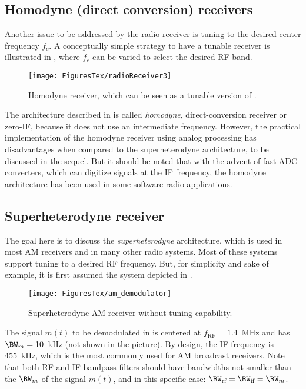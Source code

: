 \subsection{Homodyne (direct conversion) receivers}
Another issue to be addressed by the radio receiver is tuning to the desired center frequency $f_c$. 
A conceptually simple strategy to have a tunable receiver is illustrated in , where $f_c$ can be varied to select the desired RF band.

\begin{figure}[htbp]
	\centering
		\texttt{[image: FiguresTex/radioReceiver3]}		
	\caption{Homodyne receiver, which can be seen as a tunable version of .\label{fig:radioReceiver3}}
\end{figure}

The architecture described in  is called \emph{homodyne},
 direct-conversion receiver or zero-IF, because it does not use an intermediate frequency. 
However, the practical implementation of the homodyne receiver using analog processing has disadvantages when compared to the superheterodyne architecture, to be discussed in the sequel. But it should be noted that with the advent of fast ADC converters, which can digitize signals at the IF frequency, the homodyne architecture has been used in some software radio applications.

\subsection{Superheterodyne receiver}

The goal here is to discuss the \emph{superheterodyne} architecture, which is used in most AM receivers and in many other radio systems. Most of these systems support tuning to a desired RF frequency. But, for simplicity and sake of example, it is first assumed the system depicted in .

\begin{figure}[htbp]
\centering
\texttt{[image: FiguresTex/am\_demodulator]}
\caption{Superheterodyne AM receiver without tuning capability.\label{fig:am_demodulator}}
\end{figure}

The signal $m(t)$ to be demodulated in  is centered at $f_{\textrm{RF}}=1.4$~MHz and has $\BW_{m}=10$~kHz (not shown in the picture). By design, the IF frequency is 455~kHz, which is the most commonly used for AM broadcast receivers. Note that both RF and IF bandpass filters should have bandwidths not smaller than the $\BW_{m}$ of the signal $m(t)$, and in this specific case: $\BW_{\textrm{rf}}=\BW_{\textrm{if}}=\BW_{m}$. 

